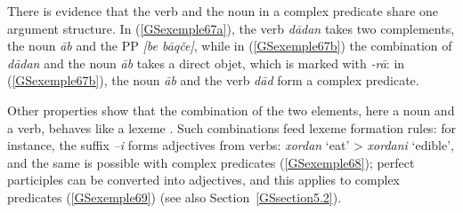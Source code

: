 \documentclass[output=paper
                ,modfonts
                ,nonflat
	        ,collection
	        ,collectionchapter
	        ,collectiontoclongg
 	        ,biblatex
                ,babelshorthands
                ,newtxmath
                ,draftmode
                ,colorlinks, citecolor=brown
]{./langsci/langscibook}
\begin{document}
{\begin{exe}
	\ex \label{GSexemple66} 
	\begin{xlist}
        \label{GSexemple66a}
		
	    \label{GSexemple66b}
		
		\end{xlist}
\end{exe}

There is evidence that the verb and the noun in a complex predicate share one argument structure. In (\ref{GSexemple67a}), the verb \textit{d\=adan} takes two complements, the noun \textit{\=ab} and the PP \textit{[be b\=aq\v ce]}, while in (\ref{GSexemple67b}) the combination of \textit{d\=adan} and the noun \textit{\=ab} takes a direct objet, which is marked with \textit{-r\=a}: in (\ref{GSexemple67b}), the noun \textit{\=ab} and the verb \textit{d\=ad} form a complex predicate.  

\begin{exe}
	\ex \label{GSexemple67} 
	\begin{xlist}
        \label{GSexemple67a}
		
	    \label{GSexemple67b}
		
		\end{xlist}
\end{exe}

Other properties show that the combination of the two elements, here a noun and a verb, behaves like a lexeme \citep{bonami2010persian}. Such combinations feed lexeme formation rules: for instance, the suffix \textit{–i} forms adjectives from verbs: \textit{xordan} `eat' > \textit{xordani} `edible', and the same is possible with complex predicates (\ref{GSexemple68}); perfect participles can be converted into adjectives, and this applies to complex predicates (\ref{GSexemple69}) (see also Section~\ref{GSsection5.2}).

}
\end{document}
